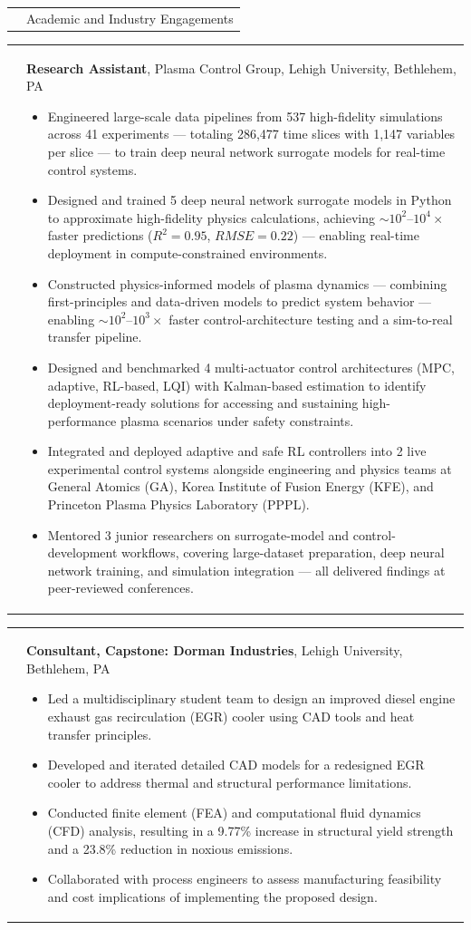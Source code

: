 \documentclass[11pt,letterpaper]{article}
\makeatletter
\newcommand{\CVSection}[1]{%
  \vspace{0.4em}
  \noindent
  \begin{tabularx}{\textwidth}{@{}p{0.82in}@{\hspace{0.14in}}X@{}}
    \raisebox{-1.45ex}{\color{rulecolor}\rule{0.82in}{4.2pt}} &
    {\fontsize{14}{16}\selectfont\color{cvcolor}#1}\\
  \end{tabularx}
  \vspace{0.55em}
}
\newcommand{\CVItem}[2]{%
  \begin{tabularx}{\textwidth}{@{}p{0.83in}@{\hspace{0.15in}}X@{}}
    \raggedleft{#1} & #2\\[3pt]
  \end{tabularx}
}
\makeatother
\begin{document}
\CVSection{Academic and Industry Engagements}
\CVItem{\hspace{-5mm}\mbox{2020--Ongoing}}{\textbf{Research Assistant}, Plasma Control Group, Lehigh University, Bethlehem, PA
\begin{itemize}
  \item Engineered large-scale data pipelines from 537 high-fidelity simulations across 41 experiments --- totaling 286{,}477 time slices with 1{,}147 variables per slice --- to train deep neural network surrogate models for real-time control systems.
  \item Designed and trained 5 deep neural network surrogate models in Python to approximate high-fidelity physics calculations, achieving $\sim\!10^2$--$10^4\times$ faster predictions ($R^2 = 0.95$, $RMSE = 0.22$) --- enabling real-time deployment in compute-constrained environments.
  \item Constructed physics-informed models of plasma dynamics --- combining first-principles and data-driven models to predict system behavior  --- enabling $\sim\!10^2$--$10^3\times$ faster control-architecture testing and a sim-to-real transfer pipeline.
  \item Designed and benchmarked 4 multi-actuator control architectures (MPC, adaptive, RL-based, LQI) with Kalman-based estimation to identify deployment-ready solutions for accessing and sustaining high-performance plasma scenarios under safety constraints.
  \item Integrated and deployed adaptive and safe RL controllers into 2 live experimental control systems alongside engineering and physics teams at General Atomics (GA), Korea Institute of Fusion Energy (KFE), and Princeton Plasma Physics Laboratory (PPPL).
  \item Mentored 3 junior researchers on surrogate-model and control-development workflows, covering large-dataset preparation, deep neural network training, and simulation integration --- all delivered findings at peer-reviewed conferences.
\end{itemize}
}
\CVItem{\hspace{-5mm}\mbox{Jan--Dec 2020}}{\textbf{Consultant, Capstone: Dorman Industries}, Lehigh University, Bethlehem, PA \begin{itemize}
  \item Led a multidisciplinary student team to design an improved diesel engine exhaust gas recirculation (EGR) cooler using CAD tools and heat transfer principles.
   \item Developed and iterated detailed CAD models for a redesigned EGR cooler to address thermal and structural performance limitations.
 \item Conducted finite element (FEA) and computational fluid dynamics (CFD) analysis, resulting in a 9.77\% increase in structural yield strength and a 23.8\% reduction in noxious emissions.
  \item Collaborated with process engineers to assess manufacturing feasibility and cost implications of implementing the proposed design.
\end{itemize}}
\end{document}
